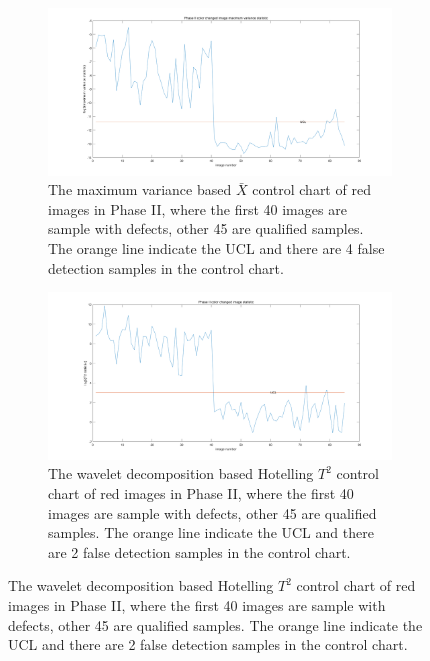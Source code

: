 \begin{figure}
    \centering
    \begin{subfigure}{\textwidth}
         \centering
         \includegraphics[width=\textwidth]{images/phaseII_color_max.png}
         \caption{The maximum variance based $\bar{X}$ control chart of red images in Phase II, where the first 40 images are sample with defects, other 45 are qualified samples. The orange line indicate the UCL and there are 4 false detection samples in the control chart.}
        \label{fig:max_result_15errors}
    \end{subfigure}
     
    \begin{subfigure}{\textwidth}
         \centering
         \includegraphics[width=\textwidth]{images/phaseII_color_t2.png}
         \caption{The wavelet decomposition based Hotelling $T^{2}$ control chart of red images in Phase II, where the first 40 images are sample with defects, other 45 are qualified samples. The orange line indicate the UCL and there are 2 false detection samples in the control chart.}
        \label{fig:T_result_d1}
    \end{subfigure}
\end{figure}

